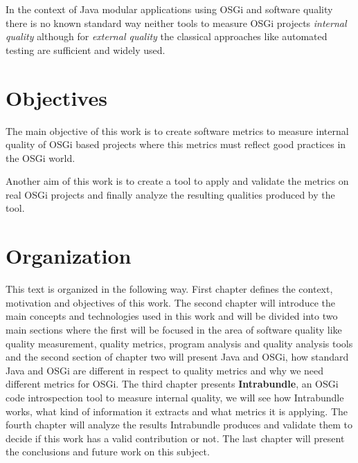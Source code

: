 In the context of Java modular applications using OSGi and software quality there is no known standard way neither tools to measure OSGi projects \textit{internal quality} \citep{Hamza 2013} although for \emph{external quality} the classical approaches like automated testing are sufficient and widely used.

        
\section{Objectives}
The main objective of this work is to create software metrics to measure internal quality of OSGi based projects where this metrics must reflect good practices in the OSGi world.

Another aim of this work is to create a tool to apply and validate the metrics on real OSGi projects and finally analyze the resulting qualities produced by the tool.  

 
\section{Organization}

This text is organized in the following way. First chapter defines the context, motivation and objectives of this work. The second chapter will introduce the main concepts and technologies used in this work and will be divided into two main sections where the first will be focused in the area of software quality like quality measurement, quality metrics, program analysis and quality analysis tools and the second section of chapter two will present Java and OSGi, how standard Java and OSGi are different in respect to quality metrics and why we need different metrics for OSGi. The third chapter presents \textbf{Intrabundle}, an OSGi code introspection tool to measure internal quality, we will see how Intrabundle works, what kind of information it extracts and what metrics it is applying. The fourth chapter will analyze the results Intrabundle produces and validate them to decide if this work has a valid contribution or not. The last chapter will present the conclusions and future work on this subject.